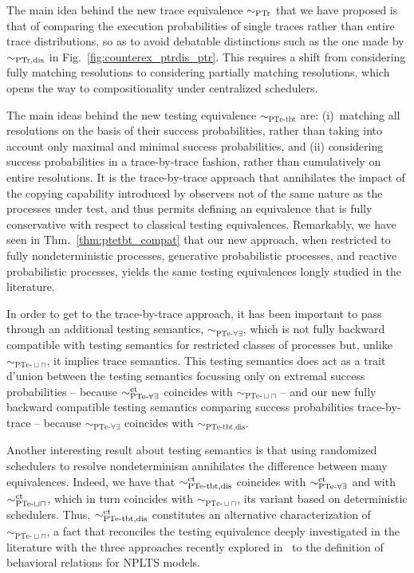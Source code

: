 \documentclass{LMCS}
\newcommand{\sbis}[1]
	{\sim_{#1}}
\begin{document}
The main idea behind the new trace equivalence $\sbis{\rm PTr}$ that we have proposed is that of comparing
the execution probabilities of single traces rather than entire trace distributions, so as to avoid
debatable distinctions such as the one made by $\sbis{\rm PTr,dis}$ in Fig.~\ref{fig:counterex_ptrdis_ptr}.
This requires a shift from considering fully matching resolutions to considering partially matching
resolutions, which opens the way to compositionality under centralized schedulers.

The main ideas behind the new testing equivalence $\sbis{\textrm{PTe-tbt}}$ are: (i)~matching all
resolutions on the basis of their success probabilities, rather than taking into account only maximal and
minimal success probabilities, and (ii) considering success probabilities in a trace-by-trace fashion,
rather than cumulatively on entire resolutions. It is the trace-by-trace approach that annihilates the
impact of the copying capability introduced by observers not of the same nature as the processes under test,
and thus permits defining an equivalence that is fully conservative with respect to classical testing
equivalences. Remarkably, we have seen in Thm.~\ref{thm:ptetbt_compat} that our new approach, when
restricted to fully nondeterministic processes, generative probabilistic processes, and reactive
probabilistic processes, yields the same testing equivalences longly studied in the literature.

In order to get to the trace-by-trace approach, it has been important to pass through an additional testing
semantics, $\sbis{\textrm{PTe-}\forall\exists}$, which is not fully backward compatible with testing
semantics for restricted classes of processes but, unlike $\sbis{\textrm{PTe-}\sqcup\sqcap}$, it implies
trace semantics. This testing semantics does act as a trait d'union between the testing semantics focussing
only on extremal success probabilities -- because $\sbis{\textrm{PTe-}\forall\exists}^{\rm ct}$ coincides
with $\sbis{\textrm{PTe-}\sqcup\sqcap}$ -- and our new fully backward compatible testing semantics comparing
success probabilities trace-by-trace -- because $\sbis{\textrm{PTe-}\forall\exists}$ coincides with
$\sbis{\textrm{PTe-tbt,dis}}$.

Another interesting result about testing semantics is that using randomized schedulers to resolve
nondeterminism annihilates the difference between many equivalences. Indeed, we have that
$\sbis{\textrm{PTe-tbt,dis}}^{\rm ct}$ coincides with $\sbis{\textrm{PTe-}\forall\exists}^{\rm ct}$ and with
$\sbis{\textrm{PTe-}\sqcup\sqcap}^{\rm ct}$, which in turn coincides with
$\sbis{\textrm{PTe-}\sqcup\sqcap}$, its variant based on deterministic schedulers. Thus,
$\sbis{\textrm{PTe-tbt,dis}}^{\rm ct}$ constitutes an alternative characterization of
$\sbis{\textrm{PTe-}\sqcup\sqcap}$, a fact that reconciles the testing equivalence deeply investigated in
the literature with the three approaches recently explored in~\cite{BDL14} to the definition of behavioral
relations for NPLTS models.
\end{document}
